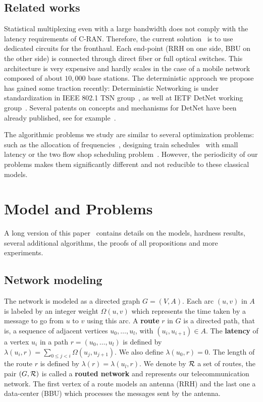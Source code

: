 \documentclass[a4paper,10pt]{IEEEtran}
\begin{document}
 \subsection*{Related works}

 Statistical multiplexing even with a large bandwidth does not comply with the latency requirements of C-RAN. Therefore, the current solution~\cite{pizzinat2015things,tayq2017real} is to use dedicated circuits for the fronthaul. Each end-point (RRH on one side, BBU on the other side) is connected through direct fiber or full optical switches. This architecture is very expensive and hardly scales in the case of a mobile network composed of about $10,000$ base stations. The deterministic approach we propose has gained some traction recently: Deterministic Networking is under standardization in IEEE 802.1 TSN group~\cite{finn-detnet-architecture-08}, as well at IETF DetNet working group~\cite{ieee802}. Several patents on concepts and mechanisms for DetNet have been already published, see for example~\cite{howe2005time,leclerc2016transmission}. 
     
The algorithmic problems we study are similar to several optimization problems: such as the allocation of frequencies~\cite{borndorfer1998frequency}, designing train schedules~\cite{strotmann2007railway} with small latency or the two flow shop scheduling problem~\cite{yu2004minimizing}. However, the periodicity of our problems makes them significantly different and not reducible to these classical models.


\section{Model and Problems}\label{sec:def}

A long version of this paper~\cite{versionlongue} contains details on the models, hardness results, 
several additional algorithms, the proofs of all propositions and more experiments.  

  \subsection{Network modeling}
  

The network is modeled as a directed graph $G=(V,A)$. Each arc  $(u,v)$ in $A$ is labeled by an integer weight $\Omega(u,v)$ which represents the time taken by a message to go from $u$ to $v$ using this arc. A {\bf route} $r$ in $G$ is a directed path, that is, a sequence of adjacent vertices $u_0, \ldots , u_{l}$, with $(u_i,u_{i+1}) \in A$.  The {\bf latency} of a vertex $u_i$ in a path $r=(u_0,\dots,u_l)$ is defined by $\lambda(u_i,r)= \sum\limits_{0 \leq j <i} \Omega(u_j, u_{j+1})$. We also define $\lambda(u_0,r)=0$. The length of the route $r$ is defined by $\lambda (r)= \lambda (u_l,r)$.
We denote by $\cal R$ a set of routes, the pair $(G,\cal R)$ is called a {\bf routed network} and represents our telecommunication network.
The first vertex of a route models an antenna (RRH) and the last one a data-center (BBU) which processes the messages sent by the antenna.
\end{document}
